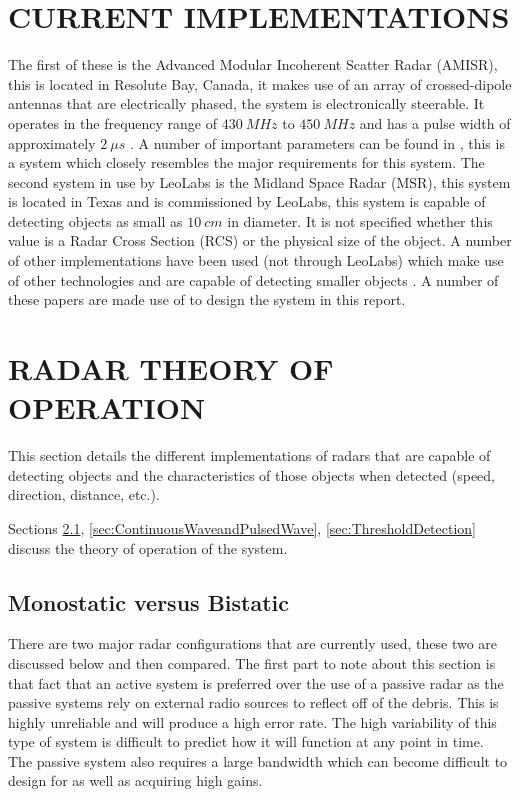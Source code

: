 \documentclass[11pt]{witseiepaper}
\begin{document}
\begin{bibunit}[witseie]
\section{CURRENT IMPLEMENTATIONS} \label{sec:CurrentImplementations}
 The first of these is the Advanced Modular Incoherent Scatter Radar (AMISR), this is located in Resolute Bay, Canada, it makes use of an array of crossed-dipole antennas that are electrically phased, the system is electronically steerable. It operates in the frequency range of $430~MHz$ to $450~MHz$ and has a pulse width of approximately $2~\mu s$ \cite{AMISR}. A number of important parameters can be found in \cite{AMISR}, this is a system which closely resembles the major requirements for this system.
The second system in use by LeoLabs is the Midland Space Radar (MSR), this system is located in Texas and is commissioned by LeoLabs, this system is capable of detecting objects as small as $10~cm$ in diameter. It is not specified whether this value is a Radar Cross Section  (RCS) or the physical size of the object.
A number of other implementations have been used (not through LeoLabs) which make use of other technologies and are capable of detecting smaller objects \cite{EISCAT, SIMO, telescope, BeamForming, OrbitDetermination, PlanarArray}. A number of these papers are made use of to design the system in this report.


\section{RADAR THEORY OF OPERATION} \label{sec:RadarTheoryOfOperation}
This section details the different implementations of radars that are capable of detecting objects and the characteristics of those objects when detected (speed, direction, distance, etc.).

Sections \ref{sec:MonostaticvsBistatic}, \ref{sec:ContinuousWaveandPulsedWave}, \ref{sec:ThresholdDetection} discuss the theory of operation of the system.

\subsection{Monostatic versus Bistatic} \label{sec:MonostaticvsBistatic}
There are two major radar configurations that are currently used, these two are discussed below and then compared. The first part to note about this section is that fact that an active system is preferred over the use of a passive radar as the passive systems rely on external radio sources to reflect off of the debris. This is highly unreliable and will produce a high error rate. The high variability of this type of system is difficult to predict how it will function at any point in time. The passive system also requires a large bandwidth which can become difficult to design for as well as acquiring high gains.


\end{bibunit}
\end{document}
